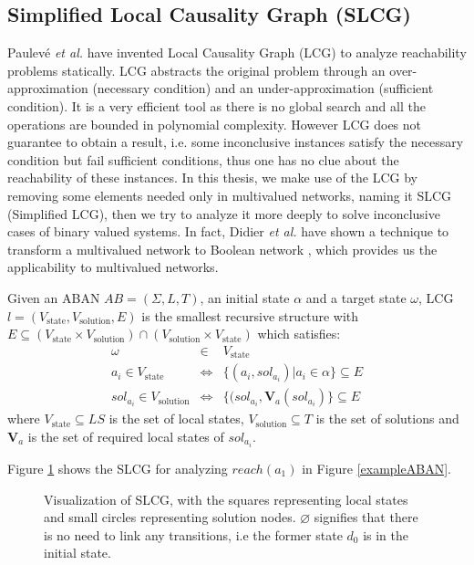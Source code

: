 \subsection{Simplified Local Causality Graph (SLCG)}
Paulev\'e \textit{et al.} \cite{pauleve2011} have invented Local Causality Graph (LCG) to analyze reachability problems statically.
LCG abstracts the original problem through an over-approximation (necessary condition) and an under-approximation (sufficient condition).
It is a very efficient tool as there is no global search and all the operations are bounded in polynomial complexity.
However LCG does not guarantee to obtain a result, i.e. some inconclusive instances satisfy the necessary condition but fail sufficient conditions, thus one has no clue about the reachability of these instances.
In this thesis, we make use of the LCG by removing some elements needed only in multivalued networks, naming it SLCG (Simplified LCG), then we try to analyze it more deeply to solve inconclusive cases of binary valued systems.
In fact, Didier \textit{et al.} have shown a technique to transform a multivalued network to Boolean network \cite{didier2011mapping}, which provides us the applicability to multivalued networks.
\begin{definition}[SLCG]\label{defSLCG}
Given an ABAN $AB = (\Sigma,L,T)$, an initial state $\alpha$ and a target state $\omega$, LCG $l= (V_{\mathrm{state}},V_{\mathrm{solution}},E)$ is the smallest recursive structure with $E \subseteq (V_{\mathrm{state}}\times V_{\mathrm{solution}})\cap (V_{\mathrm{solution}}\times V_{\mathrm{state}})$ which satisfies:
\begin{eqnarray*}
    \omega&\in& V_{\mathrm{state}} \\
    a_i\in V_{\mathrm{state}} &\Leftrightarrow& \{ (a_i, sol_{a_i})| a_i\in \alpha\}\subseteq E \\
    sol_{a_i}\in V_{\mathrm{solution}}&\Leftrightarrow& \{ (sol_{a_i},\mathbf{V}_a (sol_{a_i})\}\subseteq E
\end{eqnarray*}
where $V_{\mathrm{state}}\subseteq LS$ is the set of local states, $V_{\mathrm{solution}}\subseteq T$ is the set of solutions and $\mathbf{V}_a$ is the set of required local states of $sol_{a_i}$.
\end{definition}
\begin{example}
    Figure \ref{LCGexample} shows the SLCG for analyzing $reach(a_1)$ in Figure \ref{exampleABAN}.
    \begin{figure}[ht]
        \centering
        
        \caption[SLCG]{Visualization of SLCG, with the squares representing local states and small circles representing solution nodes.
        $\varnothing$ signifies that there is no need to link any transitions, i.e the former state $d_0$ is in the initial state.}
        \label{LCGexample}
    \end{figure}
\end{example}

